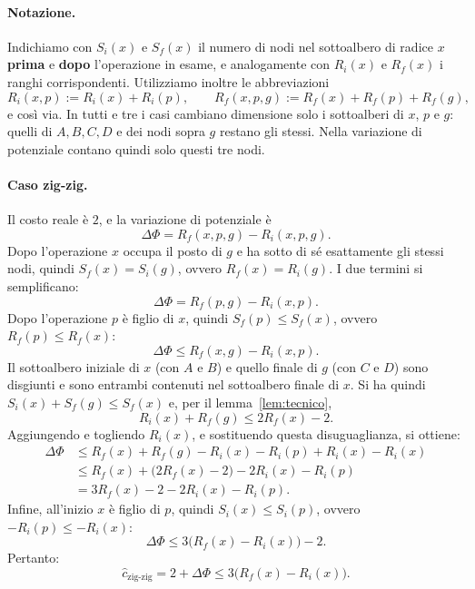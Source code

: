 \paragraph{Notazione.}
Indichiamo con $S_i(x)$ e $S_f(x)$ il numero di nodi nel sottoalbero di radice $x$ \textbf{prima} e \textbf{dopo} l'operazione in esame, e analogamente con $R_i(x)$ e $R_f(x)$ i ranghi corrispondenti. Utilizziamo inoltre le abbreviazioni
\[
R_i(x,p) := R_i(x) + R_i(p), \qquad R_f(x,p,g) := R_f(x) + R_f(p) + R_f(g),
\]
e così via. In tutti e tre i casi cambiano dimensione solo i sottoalberi di $x$, $p$ e $g$: quelli di $A, B, C, D$ e dei nodi sopra $g$ restano gli stessi. Nella variazione di potenziale contano quindi solo questi tre nodi.

\paragraph{Caso zig-zig.}
Il costo reale è $2$, e la variazione di potenziale è
\[
\Delta\Phi = R_f(x,p,g) - R_i(x,p,g).
\]
Dopo l'operazione $x$ occupa il posto di $g$ e ha sotto di sé esattamente gli stessi nodi, quindi $S_f(x) = S_i(g)$, ovvero $R_f(x) = R_i(g)$. I due termini si semplificano:
\[
\Delta\Phi = R_f(p,g) - R_i(x,p).
\]
Dopo l'operazione $p$ è figlio di $x$, quindi $S_f(p) \le S_f(x)$, ovvero $R_f(p) \le R_f(x)$:
\[
\Delta\Phi \le R_f(x,g) - R_i(x,p).
\]
Il sottoalbero iniziale di $x$ (con $A$ e $B$) e quello finale di $g$ (con $C$ e $D$) sono disgiunti e sono entrambi contenuti nel sottoalbero finale di $x$. Si ha quindi $S_i(x) + S_f(g) \le S_f(x)$ e, per il lemma~\ref{lem:tecnico},
\[
R_i(x) + R_f(g) \le 2R_f(x) - 2.
\]
Aggiungendo e togliendo $R_i(x)$, e sostituendo questa disuguaglianza, si ottiene:
\[
\begin{aligned}
\Delta\Phi &\le R_f(x) + R_f(g) - R_i(x) - R_i(p) + R_i(x) - R_i(x) \\
&\le R_f(x) + \big(2R_f(x) - 2\big) - 2R_i(x) - R_i(p) \\
&= 3R_f(x) - 2 - 2R_i(x) - R_i(p).
\end{aligned}
\]
Infine, all'inizio $x$ è figlio di $p$, quindi $S_i(x) \le S_i(p)$, ovvero $-R_i(p) \le -R_i(x)$:
\[
\Delta\Phi \le 3\big(R_f(x) - R_i(x)\big) - 2.
\]
Pertanto:
\[
\hat{c}_{\text{zig-zig}} = 2 + \Delta\Phi \le 3\big(R_f(x) - R_i(x)\big).
\]

